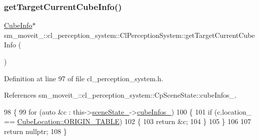 \subsubsection{\texorpdfstring{get\+Target\+Current\+Cube\+Info()}{getTargetCurrentCubeInfo()}}
{\footnotesize\ttfamily \hyperlink{structsm__moveit__4_1_1cl__perception__system_1_1CubeInfo}{Cube\+Info}$\ast$ sm\+\_\+moveit\+\_\+::cl\+\_\+perception\+\_\+system\+::\+Cl\+Perception\+System\+::get\+Target\+Current\+Cube\+Info (\begin{DoxyParamCaption}{ }\end{DoxyParamCaption})\hspace{0.3cm}{\ttfamily [inline]}}



Definition at line 97 of file cl\+\_\+perception\+\_\+system.\+h.



References sm\+\_\+moveit\+\_\+::cl\+\_\+perception\+\_\+system\+::\+Cp\+Scene\+State\+::cube\+Infos\+\_\+.


\begin{DoxyCode}
98             \{
99                 \textcolor{keywordflow}{for} (\textcolor{keyword}{auto} &c : this->\hyperlink{classsm__moveit__4_1_1cl__perception__system_1_1ClPerceptionSystem_a82ea8feeb2fa43349f91ed59137b3890}{sceneState\_}->\hyperlink{classsm__moveit__4_1_1cl__perception__system_1_1CpSceneState_a734a45934cccf19ac5c886cd94bc8cda}{cubeInfos\_})
100                 \{
101                     \textcolor{keywordflow}{if} (c.location\_ == \hyperlink{namespacesm__moveit__4_1_1cl__perception__system_a0d1b8834532a7cf9d19670791eece6d1ae5ee34c3ef8ec4a46a00a218416c7b1d}{CubeLocation::ORIGIN\_TABLE})
102                     \{
103                         \textcolor{keywordflow}{return} &c;
104                     \}
105                 \}
106 
107                 \textcolor{keywordflow}{return} \textcolor{keyword}{nullptr};
108             \}
\end{DoxyCode}
\mbox{\label{classsm__moveit__4_1_1cl__perception__system_1_1ClPerceptionSystem_a84da4b68fddd1b2c81d69d5f7aafeb94}} 
